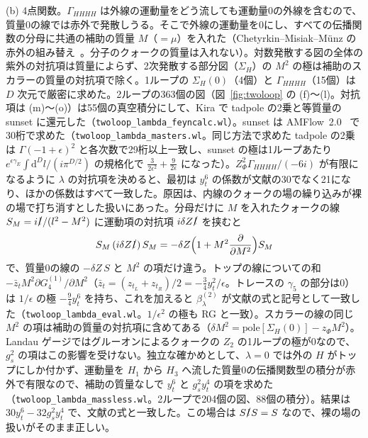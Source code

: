 \documentclass[a4paper,10pt]{ltjsarticle}
\newcommand{\dd}{\mathrm{d}}
\begin{document}
(b) 4点関数。$\Gamma_{HHHH}$ は外線の運動量をどう流しても運動量0の外線を含むので、質量0の線では赤外で発散しうる。そこで外線の運動量を0にし、すべての伝播関数の分母に共通の補助の質量 $M$（$=\mu$）を入れた（Chetyrkin--Misiak--Münz の赤外の組み替え~\cite{cmm98}。分子のクォークの質量は入れない）。対数発散する図の全体の紫外の対抗項は質量によらず、2次発散する部分図（$\Sigma_H$）の $M^2$ の極は補助のスカラーの質量の対抗項で除く。1ループの $\Sigma_H(0)$（4個）と $\Gamma_{HHHH}$（15個）は $D$ 次元で厳密に求めた。2ループの363個の図（図~\ref{fig:twoloop} の (f)〜(l)。対抗項は (m)〜(o)）は55個の真空積分にして、Kira で tadpole の2乗と等質量の sunset に還元した（\texttt{twoloop\_lambda\_feyncalc.wl}）。sunset は AMFlow~2.0~\cite{amflow,amflow2} で30桁で求めた（\texttt{twoloop\_lambda\_masters.wl}。同じ方法で求めた tadpole の2乗は $\Gamma(-1+\epsilon)^2$ と各次数で29桁以上一致し、sunset の極は1ループあたり $e^{\epsilon\gamma_E}\int\dd^Dl/(i\pi^{D/2})$ の規格化で $\frac3{2\epsilon^2}+\frac9{2\epsilon}$ になった）。$Z_\Phi^2\Gamma_{HHHH}/(-6i)$ が有限になるように $\lambda$ の対抗項を決めると、最初は $y_t^6$ の係数が文献の30でなく21になり、ほかの係数はすべて一致した。原因は、内線のクォークの場の繰り込みが裸の場で打ち消すとした扱いにあった。分母だけに $M$ を入れたクォークの線 $S_M=i\slashed l/(l^2-M^2)$ に運動項の対抗項 $i\delta Z\slashed l$ を挟むと
\begin{equation}
S_M\,(i\delta Z\slashed l)\,S_M=-\delta Z\Bigl(1+M^2\frac{\partial}{\partial M^2}\Bigr)S_M
\label{eq:cmmq}
\end{equation}
で、質量0の線の $-\delta Z\,S$ と $M^2$ の項だけ違う。トップの線についての和 $-\bar z_tM^2\partial G_4^{(1)}/\partial M^2$（$\bar z_t=(z_{t_L}+z_{t_R})/2=-\frac34y_t^2/\epsilon$。トレースの $\gamma_5$ の部分は0）は $1/\epsilon$ の極 $-\frac94y_t^6$ を持ち、これを加えると $\beta_\lambda^{(2)}$ が文献の式と記号として一致した（\texttt{twoloop\_lambda\_eval.wl}。$1/\epsilon^2$ の極も RG と一致）。スカラーの線の同じ $M^2$ の項は補助の質量の対抗項に含めてある（$\delta M^2=\mathrm{pole}[\Sigma_H(0)]-z_\Phi M^2$）。Landau ゲージではグルーオンによるクォークの $Z_2$ の1ループの極が0なので、$g_s^2$ の項はこの影響を受けない。独立な確かめとして、$\lambda=0$ では外の $H$ がトップにしか付かず、運動量を $H_1$ から $H_3$ へ流した質量0の伝播関数型の積分が赤外で有限なので、補助の質量なしで $y_t^6$ と $g_s^2y_t^4$ の項を求めた（\texttt{twoloop\_lambda\_massless.wl}。2ループで204個の図、88個の積分）。結果は $30y_t^6-32g_s^2y_t^4$ で、文献の式と一致した。この場合は $S\slashed lS=S$ なので、裸の場の扱いがそのまま正しい。
\end{document}
